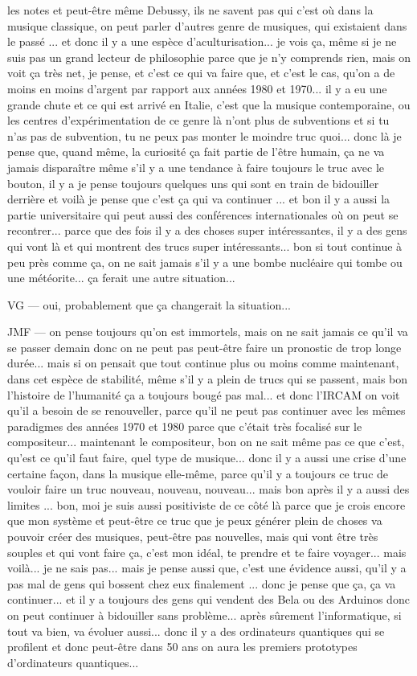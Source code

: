 les notes et peut-être même Debussy, ils ne savent pas qui c'est où dans la musique classique, on peut parler d'autres genre de musiques, qui existaient dans le passé ... et donc il y a une espèce d'aculturisation... je vois ça, même si je ne suis pas un grand lecteur de philosophie parce que je n'y comprends rien, mais on voit ça très net, je pense, et c'est ce qui va faire que, et c'est le cas, qu'on a de moins en moins d'argent par rapport aux années 1980 et 1970... il y a eu une grande chute et ce qui est arrivé en Italie, c'est que la musique contemporaine, ou les centres d'expérimentation de ce genre là n'ont plus de subventions et si tu n'as pas de subvention, tu ne peux pas monter le moindre truc quoi... donc là je pense que, quand même, la curiosité ça fait partie de l'être humain, ça ne va jamais disparaître même s'il y a une tendance à faire toujours le truc avec le bouton, il y a je pense toujours quelques uns qui sont en train de bidouiller derrière et voilà je pense que c'est ça qui va continuer ... et bon il y a aussi la partie universitaire qui peut aussi des conférences internationales où on peut se recontrer... parce que des fois il y a des choses super intéressantes, il y a des gens qui vont là et qui montrent des trucs super intéressants... bon si tout continue à peu près comme ça, on ne sait jamais s'il y a une bombe nucléaire qui tombe ou une météorite... ça ferait une autre situation... 

VG — oui, probablement que ça changerait la situation... 

JMF — on pense toujours qu'on est immortels, mais on ne sait jamais ce qu'il va se passer demain donc on ne peut pas peut-être faire un pronostic de trop longe durée... mais si on pensait que tout continue plus ou moins comme maintenant, dans cet espèce de stabilité, même s'il y a plein de trucs qui se passent, mais bon l'histoire de l'humanité ça a toujours bougé pas mal... et donc l'IRCAM on voit qu'il a besoin de se renouveller, parce qu'il ne peut pas continuer avec les mêmes paradigmes des années 1970 et 1980 parce que c'était très focalisé sur le compositeur... maintenant le compositeur, bon on ne sait même pas ce que c'est, qu'est ce qu'il faut faire, quel type de musique... donc il y a aussi une crise d'une certaine façon, dans la musique elle-même, parce qu'il y a toujours ce truc de vouloir faire un truc nouveau, nouveau, nouveau... mais bon après il y a aussi des limites ... bon, moi je suis aussi positiviste de ce côté là parce que je crois encore que mon système et peut-être ce truc que je peux générer plein de choses va pouvoir créer des musiques, peut-être pas nouvelles, mais qui vont être très souples et qui vont faire ça, c'est mon idéal, te prendre et te faire voyager... mais voilà... je ne sais pas... mais je pense aussi que, c'est une évidence aussi, qu'il y a pas mal de gens qui bossent chez eux finalement ... donc je pense que ça, ça va continuer... et il y a toujours des gens qui vendent des Bela ou des Arduinos donc on peut continuer à bidouiller sans problème... après sûrement l'informatique, si tout va bien, va évoluer aussi... donc il y a des ordinateurs quantiques qui se profilent et donc peut-être dans 50 ans on aura les premiers prototypes d'ordinateurs quantiques... 

